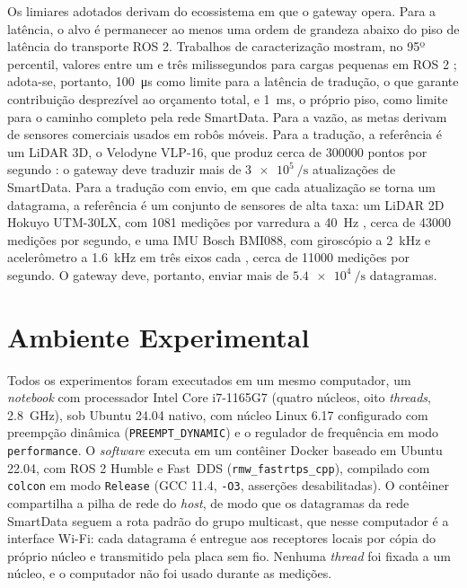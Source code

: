 \documentclass[
    12pt,
    oneside,
    a4paper,
    chapter=TITLE,
    section=TITLE,
    english,
    brazil
]{abntex2}
\begin{document}
Os limiares adotados derivam do ecossistema em que o gateway opera. Para a
latência, o alvo é permanecer ao menos uma ordem de grandeza abaixo
do piso de latência do transporte ROS 2. Trabalhos de caracterização
mostram, no 95º percentil, valores entre um e três milissegundos para
cargas pequenas em ROS 2 \cite{kronauer2021latency,maruyama2016ros2};
adota-se, portanto, \SI{100}{\micro\second} como limite para a latência de
tradução, o que garante contribuição desprezível ao orçamento total, e
\SI{1}{\milli\second}, o próprio piso, como limite para o caminho completo
pela rede SmartData. Para a vazão, as metas derivam de sensores
comerciais usados em robôs móveis. Para a tradução, a referência é um
LiDAR 3D, o Velodyne VLP-16, que produz cerca de \num{300000} pontos por
segundo \cite{velodyne2019vlp16}: o gateway deve traduzir mais de
$\SI{3e5}{\per\second}$ atualizações de SmartData. Para a tradução com
envio, em que cada atualização se torna um datagrama, a referência é um
conjunto de sensores de alta taxa: um LiDAR 2D Hokuyo UTM-30LX, com
\num{1081} medições por varredura a \SI{40}{\hertz}
\cite{hokuyo2012utm30lx}, cerca de \num{43000} medições por segundo, e
uma IMU Bosch BMI088, com giroscópio a \SI{2}{\kilo\hertz} e acelerômetro
a \SI{1.6}{\kilo\hertz} em três eixos cada \cite{bosch2018bmi088}, cerca
de \num{11000} medições por segundo. O gateway deve, portanto, enviar
mais de $\SI{5.4e4}{\per\second}$ datagramas.

\section{Ambiente Experimental}
\label{sec:ambiente}

Todos os experimentos foram executados em um mesmo computador, um
\textit{notebook} com processador Intel Core i7-1165G7 (quatro núcleos,
oito \textit{threads}, \SI{2.8}{\giga\hertz}), sob Ubuntu 24.04 nativo,
com núcleo Linux 6.17 configurado com preempção dinâmica
(\texttt{PREEMPT\_DYNAMIC}) e o regulador de frequência em modo
\texttt{performance}. O \textit{software} executa em um contêiner Docker
baseado em Ubuntu 22.04, com ROS 2 Humble e Fast~DDS
(\texttt{rmw\_fastrtps\_cpp}), compilado com \texttt{colcon} em modo
\texttt{Release} (GCC 11.4, \texttt{-O3}, asserções desabilitadas). O
contêiner compartilha a pilha de rede do \textit{host}, de modo que os
datagramas da rede SmartData seguem a rota padrão do grupo multicast, que
nesse computador é a interface Wi-Fi: cada datagrama é entregue aos
receptores locais por cópia do próprio núcleo e transmitido pela placa sem
fio. Nenhuma \textit{thread} foi fixada a um núcleo, e o computador não
foi usado durante as medições.
\end{document}
